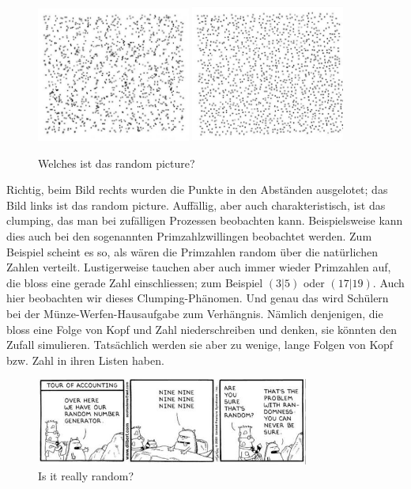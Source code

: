 \documentclass[%
11pt,%
twoside,%
titlepage,%
german,%
headsepline%
]{scrartcl}
\begin{document}
\begin{figure}[h]
    \centering
    \includegraphics[width=0.45\textwidth]{pictures/pointa.jpg}
    \includegraphics[width=0.45\textwidth]{pictures/pointb.jpg}
    \caption{Welches ist das \glqq random picture\grqq?}
    \label{fig:randomness}
\end{figure}

Richtig, beim Bild rechts wurden die Punkte in den Abständen ausgelotet; das Bild links ist das random picture. Auffällig, aber auch charakteristisch, ist das \glqq clumping\grqq, das man bei zufälligen Prozessen beobachten kann. Beispielsweise kann dies auch bei den sogenannten Primzahlzwillingen beobachtet werden. Zum Beispiel scheint es so, als wären die Primzahlen random über die natürlichen Zahlen verteilt. Lustigerweise tauchen aber auch immer wieder Primzahlen auf, die bloss eine gerade Zahl einschliessen; zum Beispiel $(3|5)$ oder $(17|19)$. Auch hier beobachten wir dieses Clumping-Phänomen. Und genau das wird Schülern bei der Münze-Werfen-Hausaufgabe zum Verhängnis. Nämlich denjenigen, die bloss eine Folge von Kopf und Zahl niederschreiben und denken, sie könnten den Zufall simulieren. Tatsächlich werden sie aber zu wenige, lange Folgen von Kopf bzw. Zahl in ihren Listen haben.

\begin{figure}
    \centering
    \includegraphics[width=0.8\textwidth]{pictures/randomgenerator.jpg}
    \caption{Is it really random?}
\end{figure}
\end{document}
